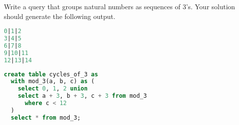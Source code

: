 \question
Write a query that groups natural numbers as sequences of 3's. Your solution should generate the following output.
\begin{lstlisting}[language=SQL]
0|1|2
3|4|5
6|7|8
9|10|11
12|13|14
\end{lstlisting}

\begin{solution}[2.5cm]
\begin{lstlisting}[language=SQL]
create table cycles_of_3 as
  with mod_3(a, b, c) as (
    select 0, 1, 2 union
    select a + 3, b + 3, c + 3 from mod_3 
      where c < 12
  )
  select * from mod_3;
\end{lstlisting}
\end{solution}

